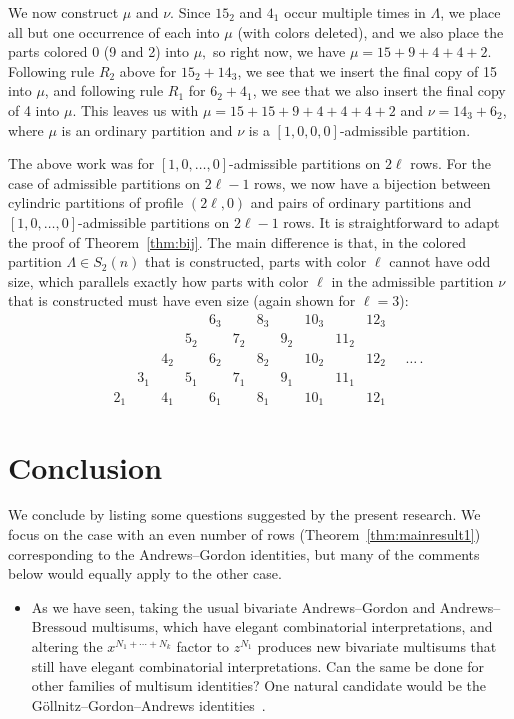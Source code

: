 \documentclass[pdftex]{sigma}
\numberwithin{equation}{section}
\theoremstyle{definition}
\begin{document}
We now construct $\mu$ and $\nu$. Since $15_2$ and $4_1$ occur multiple times in $\Lambda$, we place all but one occurrence of each into $\mu$ (with colors deleted), and we also place the parts colored 0 (9 and 2) into $\mu,$ so right now, we have $\mu = 15+9+4+4+2.$ Following rule $R_2$ above for $15_2+14_3$, we see that we insert the final copy of 15 into $\mu$, and following rule $R_1$ for $6_2+4_1$, we see that we also insert the final copy of 4 into $\mu$. This leaves us with $\mu = 15+15+9+4+4+4+2$ and $\nu = 14_3+6_2$, where $\mu$ is an ordinary partition and $\nu$ is a $[1,0,0,0]$-admissible partition.

The above work was for $[1,0,\dots,0]$-admissible partitions on $2\ell$ rows. For the case of admissible partitions on $2\ell-1$ rows, we now have a bijection between cylindric partitions of profile $(2\ell,0)$ and pairs of ordinary partitions and $[1,0,\dots,0]$-admissible partitions on $2\ell-1$ rows. It is straightforward to adapt the proof of Theorem~\ref{thm:bij}. The main difference is that, in the colored partition $\Lambda \in S_2(n)$ that is constructed, parts with color $\ell$ cannot have odd size, which parallels exactly how parts with color $\ell$ in the admissible partition $\nu$ that is constructed must have even size (again shown for $\ell=3$):
\begin{equation*}
\begin{matrix}
& && && 6_3 && 8_3 && 10_3 && 12_3\\
 && && 5_2 && 7_2 && 9_2 && 11_2 & \\
& && 4_2 && 6_2 && 8_2 && 10_2 && 12_2\\
 && 3_1 && 5_1 && 7_1 && 9_1 && 11_1 & \\
& 2_1 && 4_1 && 6_1 && 8_1 && 10_1 && 12_1
 \end{matrix}\quad\dots\,.
\end{equation*}

\section{Conclusion}\label{sec:conc7}

We conclude by listing some questions suggested by the present research. We focus on the case with an even number of rows (Theorem~\ref{thm:mainresult1}) corresponding to the Andrews--Gordon identities, but many of the comments below would equally apply to the other case.
\begin{itemize}\itemsep=0pt
 \item As we have seen, taking the usual bivariate Andrews--Gordon and Andrews--Bressoud multisums, which have elegant combinatorial interpretations, and altering the $x^{N_1+\cdots+N_k}$ factor to $z^{N_1}$ produces new bivariate multisums that still have elegant combinatorial interpretations. Can the same be done for other families of multisum identities? One natural candidate would be the G\"ollnitz--Gordon--Andrews identities~\cite{And_GGA1,And_GGA2}.
 \end{itemize}
\end{document}
